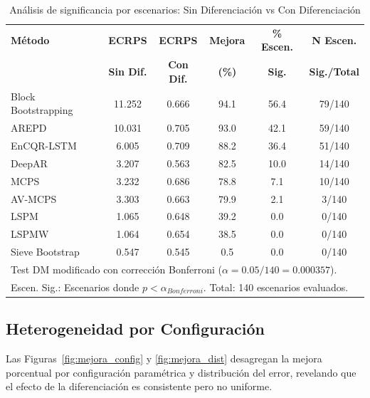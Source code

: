 \begin{table}[htbp]
\centering
\caption{Análisis de significancia por escenarios: Sin Diferenciación vs Con Diferenciación}
\label{tab:dm_diferenciacion}
\small
\begin{tabular}{lccccc}
\toprule
\textbf{Método} & \textbf{ECRPS} & \textbf{ECRPS} & \textbf{Mejora} & \textbf{\% Escen.} & \textbf{N Escen.} \\
 & \textbf{Sin Dif.} & \textbf{Con Dif.} & \textbf{(\%)} & \textbf{Sig.} & \textbf{Sig./Total} \\
\midrule
Block Bootstrapping & 11.252 & 0.666 & 94.1 & 56.4 & 79/140 \\
AREPD & 10.031 & 0.705 & 93.0 & 42.1 & 59/140 \\
EnCQR-LSTM & 6.005 & 0.709 & 88.2 & 36.4 & 51/140 \\
DeepAR & 3.207 & 0.563 & 82.5 & 10.0 & 14/140 \\
MCPS & 3.232 & 0.686 & 78.8 & 7.1 & 10/140 \\
AV-MCPS & 3.303 & 0.663 & 79.9 & 2.1 & 3/140 \\
LSPM & 1.065 & 0.648 & 39.2 & 0.0 & 0/140 \\
LSPMW & 1.064 & 0.654 & 38.5 & 0.0 & 0/140 \\
Sieve Bootstrap & 0.547 & 0.545 & 0.5 & 0.0 & 0/140 \\
\bottomrule
\multicolumn{6}{l}{\footnotesize Test DM modificado con corrección Bonferroni ($\alpha = 0.05/140 = 0.000357$).} \\
\multicolumn{6}{l}{\footnotesize Escen. Sig.: Escenarios donde $p < \alpha_{Bonferroni}$. Total: 140 escenarios evaluados.}
\end{tabular}
\end{table}

\subsection{Heterogeneidad por Configuración}
\label{subsec:hetero_config_diff}

Las Figuras~\ref{fig:mejora_config} y \ref{fig:mejora_dist} desagregan la mejora porcentual por configuración paramétrica y distribución del error, revelando que el efecto de la diferenciación es consistente pero no uniforme.

